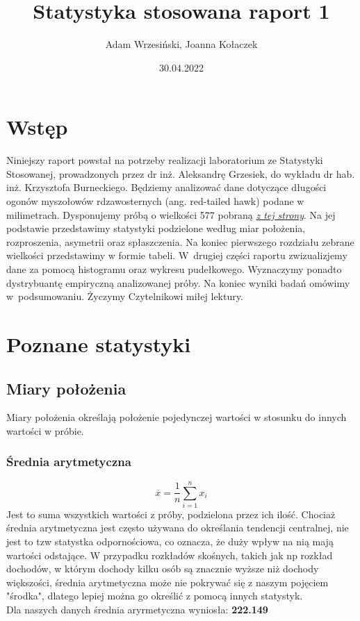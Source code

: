 \documentclass{article}
\title{Statystyka stosowana raport 1}
\author{Adam Wrzesiński, Joanna Kołaczek}
\date{30.04.2022}
\theoremstyle{break}
\begin{document}
	\maketitle
	\tableofcontents
	\clearpage
	\section{Wstęp}
	
	Niniejszy raport powstał na potrzeby realizacji laboratorium ze Statystyki Stosowanej, prowadzonych przez dr inż. Aleksandrę Grzesiek, do wykładu dr hab. inż. Krzysztofa Burneckiego. Będziemy analizować dane dotyczące długości ogonów myszołowów rdzawosternych (ang. red-tailed hawk) podane w milimetrach. Dysponujemy próbą o wielkości 577 pobraną \href{ https://vincentarelbundock.github.io/Rdatasets/datasets.html}{\textit{z tej strony}}. Na jej podstawie przedstawimy statystyki podzielone według miar położenia, rozproszenia, asymetrii oraz spłaszczenia. Na koniec pierwszego rozdziału zebrane wielkości przedstawimy w formie tabeli.  W~drugiej części raportu zwizualizjemy dane za pomocą histogramu oraz wykresu pudełkowego. Wyznaczymy ponadto dystrybuantę empiryczną analizowanej próby. Na koniec wyniki badań omówimy w~podsumowaniu. Życzymy Czytelnikowi miłej lektury.
	
	\section{Poznane statystyki}
	\subsection{Miary położenia}
	
	Miary położenia określają położenie pojedynczej wartości w stosunku do innych wartości w próbie. 
	
	\subsubsection*{Średnia arytmetyczna}
	$$\overline{x}=\frac{1}{n}\sum\limits_{i=1}^{n}x_i$$
	Jest to suma wszystkich wartości z próby, podzielona przez ich ilość. Chociaż średnia arytmetyczna jest często używana do określania tendencji centralnej, nie jest to tzw statystka odpornościowa, co oznacza, że duży wpływ na nią mają wartości odstające. W przypadku rozkładów skośnych, takich jak np rozkład dochodów, w którym dochody kilku osób są znacznie wyższe niż dochody większości, średnia arytmetyczna może nie pokrywać się z naszym pojęciem "środka", dlatego lepiej można go określić z pomocą innych statystyk.\\
	Dla naszych danych średnia aryrmetyczna wyniosła: \textbf{222.149}
\end{document}
